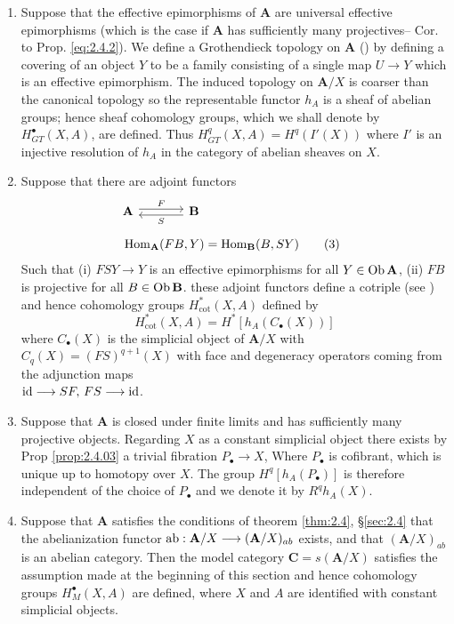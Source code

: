 \documentclass[../main]{subfiles}
\begin{document}
\begin{enumerate} [label=(\arabic*)\quad]
  \item Suppose that the effective epimorphisms of $\mathbf A$ are universal effective epimorphisms (which is the case if $\mathbf A$ has sufficiently many projectives-- Cor. to Prop. \ref{eq:2.4.2}). We define a Grothendieck topology on  $\mathbf A$ (\cite{artin_grothendieck_1962}) by defining a covering of an object $Y$ to be a family consisting of a single map $U \longrightarrow  Y$ which is an effective epimorphism. The induced topology on $\mathbf{A} / X$ is coarser than the canonical topology so the representable functor $h_{A}$ is a sheaf of abelian groups; hence sheaf cohomology groups, which we shall denote by $H_{GT}^{\bullet} (X,A)$, are defined. Thus $H_{GT}^{q} (X,A) = H^q(I' (X))$ where $I'$ is an injective resolution of  $h_{A}$ in the category of abelian sheaves on $X.$ 


    \item Suppose that there are adjoint functors 
      \begin{align} \label{eq:2.5.3}
        \begin{tikzcd}[column sep = large, ampersand replacement = \&]
          \mathbf{A} \rar["F", shift left] \& \lar["S", shift left] \mathbf{B} 
          \end{tikzcd}  \notag \\[0.5em] 
          \Hom_{\mathbf{A}}(FB,Y) &= \Hom_{\mathbf{B}}(B,SY) \tag{3}
      \end{align}
      Such that (i) $FSY \longrightarrow  Y$ is an effective epimorphisms for all $Y \in \operatorname{Ob} \mathbf{A}$, (ii) $FB$ is projective for all $B \in \operatorname{Ob} \mathbf{B} $. these adjoint functors define a cotriple (see \cite{barr_acyclic_1966}) and hence cohomology groups $H_{\cot}^{*}(X,A)$ defined by 
      \[ 
H_{\cot}^{*} (X,A) = H^{*}[h_{A}(C_\bullet(X))] 
      \] 
      where $C_\bullet(X)$ is the simplicial object of $\mathbf{A} / X$ with $C_{q}(X) = (FS)^{q+1}(X)$ with face and degeneracy operators coming from the adjunction maps\\ $\operatorname{id} \longrightarrow  SF,\, FS \longrightarrow  \operatorname{id} $. 

    \item Suppose that $\mathbf A$ is closed under finite limits and has sufficiently many projective objects. Regarding $X$ as a constant simplicial object there exists by Prop \ref{prop:2.4.03} a trivial fibration $P_\bullet \longrightarrow  X$, Where $P_\bullet$ is cofibrant, which is unique up to homotopy over $X$. The group $H^q [h_{A}(P_\bullet)]$ is therefore independent of the choice of $P_\bullet$ and we denote it by $R^{q}h_{A}(X)$.


      \item Suppose that $\mathbf A$ satisfies the conditions of theorem \ref{thm:2.4}, \S\ref{sec:2.4} that the abelianization functor $\operatorname{ab}: \mathbf{A} / X \longrightarrow  (\mathbf{A} / X)_{ab}$ exists, and that $(\mathbf{A} / X)_{ab}$ is an abelian category. Then the model category $\mathbf C = s (\mathbf{A} / X)$ satisfies the assumption made at the beginning of this section and hence cohomology groups $H_{M}^{\bullet} (X,A)$ are defined, where $X$ and $A$ are identified with constant simplicial objects.
  \end{enumerate}
\end{document}
